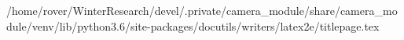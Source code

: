 /home/rover/WinterResearch/devel/.private/camera_module/share/camera_module/venv/lib/python3.6/site-packages/docutils/writers/latex2e/titlepage.tex
